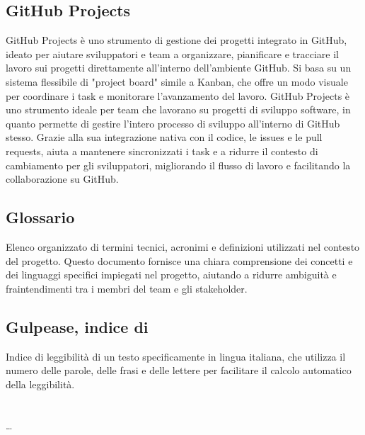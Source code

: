 \subsection*{GitHub Projects}
GitHub Projects è uno strumento di gestione dei progetti integrato in GitHub, ideato per aiutare sviluppatori e team a organizzare, pianificare e tracciare 
il lavoro sui progetti direttamente all'interno dell'ambiente GitHub. Si basa su un sistema flessibile di "project board" simile a Kanban, che offre un modo 
visuale per coordinare i task e monitorare l’avanzamento del lavoro. GitHub Projects è uno strumento ideale per team che lavorano su progetti di sviluppo 
software, in quanto permette di gestire l’intero processo di sviluppo all'interno di GitHub stesso. Grazie alla sua integrazione nativa con il codice, le 
issues e le pull requests, aiuta a mantenere sincronizzati i task e a ridurre il contesto di cambiamento per gli sviluppatori, migliorando il flusso di 
lavoro e facilitando la collaborazione su GitHub.

\subsection*{Glossario}
Elenco organizzato di termini tecnici, acronimi e definizioni utilizzati nel contesto del progetto. Questo documento fornisce una chiara comprensione dei 
concetti e dei linguaggi specifici impiegati nel progetto, aiutando a ridurre ambiguità e fraintendimenti tra i membri del team e gli stakeholder.

\subsection*{Gulpease, indice di}
Indice di leggibilità di un testo specificamente in lingua italiana, che utilizza il numero delle parole, delle frasi e delle lettere per facilitare il 
calcolo automatico della leggibilità.

\newpage



\section{}

\dots

\newpage



\section{}

